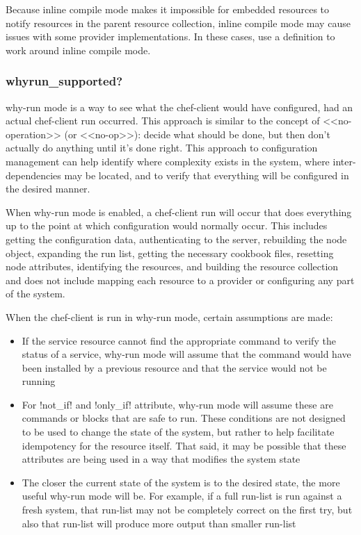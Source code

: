 Because inline compile mode makes it impossible for embedded resources to notify resources in the parent resource collection, inline compile mode may cause issues with some provider implementations. In these cases, use a definition to work around inline compile mode.

\subsubsection{whyrun\_supported?}

why-run mode is a way to see what the chef-client would have configured, had an actual chef-client run occurred. This approach is similar to the concept of <<no-operation>> (or <<no-op>>): decide what should be done, but then don't actually do anything until it's done right. This approach to configuration management can help identify where complexity exists in the system, where inter-dependencies may be located, and to verify that everything will be configured in the desired manner.

When why-run mode is enabled, a chef-client run will occur that does everything up to the point at which configuration would normally occur. This includes getting the configuration data, authenticating to the server, rebuilding the node object, expanding the run list, getting the necessary cookbook files, resetting node attributes, identifying the resources, and building the resource collection and does not include mapping each resource to a provider or configuring any part of the system.

When the chef-client is run in why-run mode, certain assumptions are made:

\begin{itemize}
  \item If the service resource cannot find the appropriate command to verify the status of a service, why-run mode will assume that the command would have been installed by a previous resource and that the service would not be running
  \item For \inline!not_if! and \inline!only_if! attribute, why-run mode will assume these are commands or blocks that are safe to run. These conditions are not designed to be used to change the state of the system, but rather to help facilitate idempotency for the resource itself. That said, it may be possible that these attributes are being used in a way that modifies the system state
  \item The closer the current state of the system is to the desired state, the more useful why-run mode will be. For example, if a full run-list is run against a fresh system, that run-list may not be completely correct on the first try, but also that run-list will produce more output than smaller run-list
\end{itemize}

